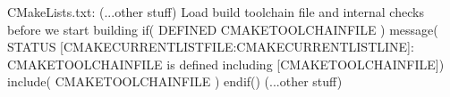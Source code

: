 \documentclass[letterpaper,10pt,english]{sphinxmanual}
\begin{document}

\begin{sphinxVerbatim}[commandchars=\\\{\}]
CMakeLists.txt:
\PYGZhy{}\PYGZhy{}\PYGZhy{}\PYGZhy{}\PYGZhy{}\PYGZhy{}\PYGZhy{}\PYGZhy{}\PYGZhy{}\PYGZhy{}\PYGZhy{}\PYGZhy{}\PYGZhy{}\PYGZhy{}\PYGZhy{}
(...other stuff)
\PYGZsh{}
\PYGZsh{} Load build toolchain file and internal checks before we start building
\PYGZsh{}
if( DEFINED CMAKE\PYGZus{}TOOLCHAIN\PYGZus{}FILE )
        message( STATUS \PYGZdq{}[\PYGZdl{}\PYGZob{}CMAKE\PYGZus{}CURRENT\PYGZus{}LIST\PYGZus{}FILE\PYGZcb{}:\PYGZdl{}\PYGZob{}CMAKE\PYGZus{}CURRENT\PYGZus{}LIST\PYGZus{}LINE\PYGZcb{}]: CMAKE\PYGZus{}TOOLCHAIN\PYGZus{}FILE is defined \PYGZhy{}\PYGZhy{} including [\PYGZdl{}\PYGZob{}CMAKE\PYGZus{}TOOLCHAIN\PYGZus{}FILE\PYGZcb{}]\PYGZdq{})
        include( \PYGZdl{}\PYGZob{}CMAKE\PYGZus{}TOOLCHAIN\PYGZus{}FILE\PYGZcb{} )
endif()
(...other stuff)
\end{sphinxVerbatim}

\end{document}
